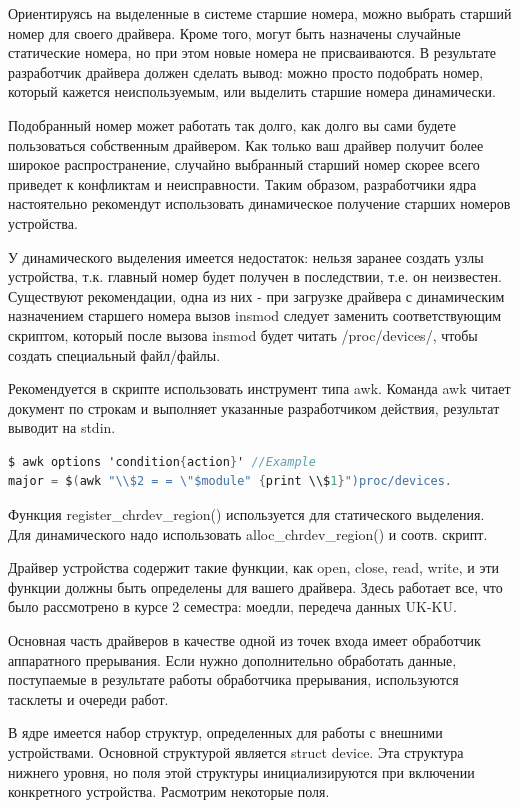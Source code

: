 \documentclass[12pt,a4paper]{scrreprt}
\begin{document}
Ориентируясь на выделенные в системе старшие номера, можно выбрать старший номер для своего драйвера. Кроме того, могут быть назначены случайные статические номера, но при этом новые номера не присваиваются. В результате разработчик драйвера должен сделать вывод: можно просто подобрать номер, который кажется неиспользуемым, или выделить старшие номера динамически.

Подобранный номер может работать так долго, как долго вы сами будете пользоваться собственным драйвером. Как только ваш драйвер получит более широкое распространение, случайно выбранный старший номер скорее всего приведет к конфликтам и неисправности. Таким образом, разработчики ядра настоятельно рекомендут использовать динамическое получение старших номеров устройства. 

У динамического выделения имеется недостаток: нельзя заранее создать узлы устройства, т.к. главный номер будет получен в последствии, т.е. он неизвестен. Существуют рекомендации, одна из них - при загрузке драйвера с динамическим назначением старшего номера вызов insmod следует заменить соответствующим скриптом, который после вызова insmod будет читать /proc/devices/, чтобы создать специальный файл/файлы. 

Рекомендуется в скрипте использовать инструмент типа awk. Команда awk читает документ по строкам и выполняет указанные разработчиком действия, результат выводит на stdin.

\begin{lstlisting}[language=C]
$ awk options 'condition{action}' //Example
major = $(awk "\\$2 = = \"$module" {print \\$1}")proc/devices.
\end{lstlisting}

Функция register\_chrdev\_region() используется для статического выделения. Для динамического надо использовать alloc\_chrdev\_region() и соотв. скрипт.

Драйвер устройства содержит такие функции, как open, close, read, write, и эти функции должны быть определены для вашего драйвера. Здесь работает все, что было рассмотрено в курсе 2 семестра: моедли, передеча данных UK-KU.

Основная часть драйверов в качестве одной из точек входа имеет обработчик аппаратного прерывания. Если нужно дополнительно обработать данные, поступаемые в результате работы обработчика прерывания, используются тасклеты и очереди работ.

В ядре имеется набор структур, определенных для работы с внешними устройствами. Основной структурой является struct device. Эта структура нижнего уровня, но поля этой структуры инициализируются при включении конкретного устройства. Расмотрим некоторые поля.
\end{document}
